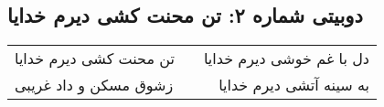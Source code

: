 \begin{center}
\section*{دوبیتی شماره ۲: تن محنت کشی دیرم خدایا}
\label{sec:002}
\begin{longtable}{l p{0.5cm} r}
تن محنت کشی دیرم خدایا
&&
دل با غم خوشی دیرم خدایا
\\
زشوق مسکن و داد غریبی
&&
به سینه آتشی دیرم خدایا
\\
\end{longtable}
\end{center}
